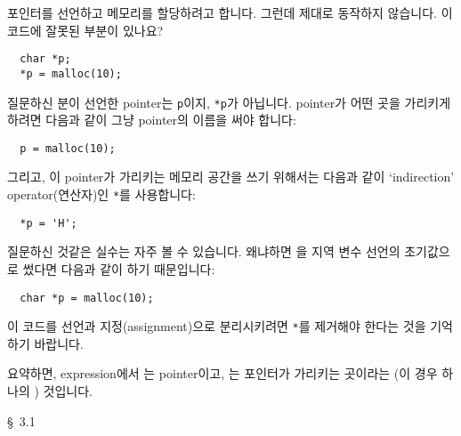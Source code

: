 \begin{faq}
	포인터를 선언하고 메모리를 할당하려고 합니다.  그런데 제대로
	동작하지 않습니다.  이 코드에 잘못된 부분이 있나요?

\begin{verbatim}
  char *p;
  *p = malloc(10);
\end{verbatim}

\A
	질문하신 분이 선언한 pointer는 \verb+p+이지, \verb+*p+가 아닙니다.
	pointer가 어떤 곳을 가리키게 하려면 다음과 같이 그냥 pointer의
	이름을 써야 합니다:

\begin{verbatim}
  p = malloc(10);
\end{verbatim}

	\noindent 그리고, 이 pointer가 가리키는 메모리 공간을 쓰기 위해서는
	다음과 같이 `indirection' operator(연산자)인 \verb+*+를 사용합니다:

\begin{verbatim}
  *p = 'H';
\end{verbatim}

	질문하신 것같은 실수는 자주 볼 수 있습니다.
	왜냐하면 을 지역 변수 선언의 초기값으로 썼다면 다음과 
	같이 하기 때문입니다:

\begin{verbatim}
  char *p = malloc(10);
\end{verbatim}

	이 코드를 선언과 지정(assignment)으로 분리시키려면 \verb+*+를
	제거해야 한다는 것을 기억하기 바랍니다.

	요약하면, expression에서 는 pointer이고, 는
	포인터가 가리키는 곳이라는 (이 경우 하나의 ) 것입니다.


\R
	\cite{ctp} \S\ 3.1 
\end{faq}


